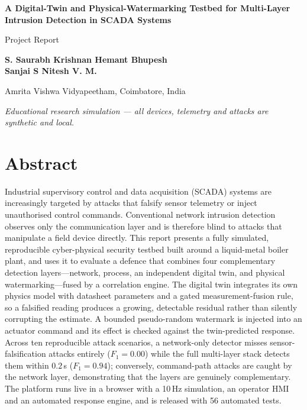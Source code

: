 \documentclass[11pt,a4paper]{article}
\begin{document}
\begin{titlepage}
\centering
\vspace*{2cm}
{\LARGE\bfseries A Digital-Twin and Physical-Watermarking Testbed for Multi-Layer Intrusion Detection in SCADA Systems\par}
\vspace{0.6cm}
{\large Project Report\par}
\vspace{2cm}
{\large\bfseries
S. Saurabh Krishnan \quad Hemant Bhupesh \\[4pt]
Sanjai S \quad Nitesh V. M.\par}
\vspace{0.8cm}
{\large Amrita Vishwa Vidyapeetham, Coimbatore, India\par}
\vfill
{\itshape Educational research simulation --- all devices, telemetry and attacks are synthetic and local.\par}
\vspace{1cm}
\end{titlepage}

\tableofcontents
\newpage

\section*{Abstract}
Industrial supervisory control and data acquisition (SCADA) systems are increasingly targeted by attacks that falsify sensor telemetry or inject unauthorised control commands. Conventional network intrusion detection observes only the communication layer and is therefore blind to attacks that manipulate a field device directly. This report presents a fully simulated, reproducible cyber-physical security testbed built around a liquid-metal boiler plant, and uses it to evaluate a defence that combines four complementary detection layers---network, process, an independent digital twin, and physical watermarking---fused by a correlation engine. The digital twin integrates its own physics model with datasheet parameters and a gated measurement-fusion rule, so a falsified reading produces a growing, detectable residual rather than silently corrupting the estimate. A bounded pseudo-random watermark is injected into an actuator command and its effect is checked against the twin-predicted response. Across ten reproducible attack scenarios, a network-only detector misses sensor-falsification attacks entirely ($F_1 = 0.00$) while the full multi-layer stack detects them within $0.2$\,s ($F_1 = 0.94$); conversely, command-path attacks are caught by the network layer, demonstrating that the layers are genuinely complementary. The platform runs live in a browser with a 10\,Hz simulation, an operator HMI and an automated response engine, and is released with 56 automated tests.
\end{document}
